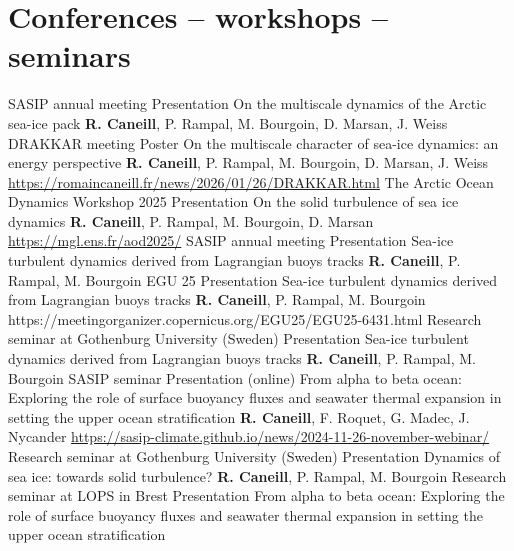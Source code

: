 \documentclass[11pt,a4paper,roman]{moderncv}
\begin{document}
\section{Conferences -- workshops -- seminars}
        {SASIP annual meeting}
        {Presentation}
        {On the multiscale dynamics of the Arctic sea-ice pack}
        {\textbf{R. Caneill}, P. Rampal, M. Bourgoin, D. Marsan, J. Weiss}
        {}
        {DRAKKAR meeting}
        {Poster}
        {On the multiscale character of sea-ice dynamics: an energy perspective}
        {\textbf{R. Caneill}, P. Rampal, M. Bourgoin, D. Marsan, J. Weiss}
        {\href{https://romaincaneill.fr/news/2026/01/26/DRAKKAR.html}{https://romaincaneill.fr/news/2026/01/26/DRAKKAR.html}}
        {The Arctic Ocean Dynamics Workshop 2025}
        {Presentation}
        {On the solid turbulence of sea ice dynamics}
        {\textbf{R. Caneill}, P. Rampal, M. Bourgoin, D. Marsan}
        {\href{https://mgl.ens.fr/aod2025/}{https://mgl.ens.fr/aod2025/}}        
        {SASIP annual meeting}
        {Presentation}
        {Sea-ice turbulent dynamics derived from Lagrangian buoys tracks}
        {\textbf{R. Caneill}, P. Rampal, M. Bourgoin}
        {}
        {EGU 25}
        {Presentation}
        {Sea-ice turbulent dynamics derived from Lagrangian buoys tracks}
        {\textbf{R. Caneill}, P. Rampal, M. Bourgoin}
        {https://meetingorganizer.copernicus.org/EGU25/EGU25-6431.html}
        {Research seminar at Gothenburg University (Sweden)}
        {Presentation}
        {Sea-ice turbulent dynamics derived from Lagrangian buoys tracks}
        {\textbf{R. Caneill}, P. Rampal, M. Bourgoin}
        {}
        {SASIP seminar}
        {Presentation (online)}
        {From alpha to beta ocean: Exploring the role of surface buoyancy fluxes and seawater thermal expansion in setting the upper ocean stratification}
        {\textbf{R. Caneill}, F. Roquet, G. Madec, J. Nycander}
        {\href{https://sasip-climate.github.io/news/2024-11-26-november-webinar/}{https://sasip-climate.github.io/news/2024-11-26-november-webinar/}}
        {Research seminar at Gothenburg University (Sweden)}
        {Presentation}
        {Dynamics of sea ice: towards solid turbulence?}
        {\textbf{R. Caneill}, P. Rampal, M. Bourgoin}
        {}
        {Research seminar at LOPS in Brest}
        {Presentation}
        {From alpha to beta ocean: Exploring the role of surface buoyancy fluxes and seawater thermal expansion in setting the upper ocean stratification}
\end{document}
